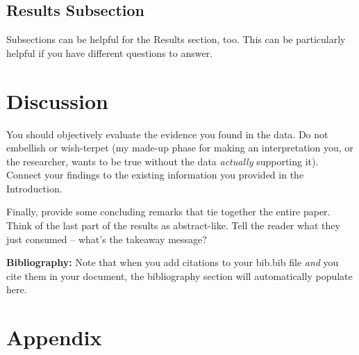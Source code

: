 \documentclass{article}\usepackage[]{graphicx}\usepackage[]{xcolor}
\begin{document}
\begin{multicols}{2}
\subsection{Results Subsection}
Subsections can be helpful for the Results section, too. This can be particularly helpful if you have different questions to answer. 


\section{Discussion}
 You should objectively evaluate the evidence you found in the data. Do not embellish or wish-terpet (my made-up phase for making an interpretation you, or the researcher, wants to be true without the data \emph{actually} supporting it). Connect your findings to the existing information you provided in the Introduction.

Finally, provide some concluding remarks that tie together the entire paper. Think of the last part of the results as abstract-like. Tell the reader what they just consumed -- what's the takeaway message?

\vspace{2em}

\noindent\textbf{Bibliography:} Note that when you add citations to your bib.bib file \emph{and}
you cite them in your document, the bibliography section will automatically populate here.

\begin{tiny}

\end{tiny}
\end{multicols}

\newpage
\onecolumn
\section{Appendix}
\end{document}

